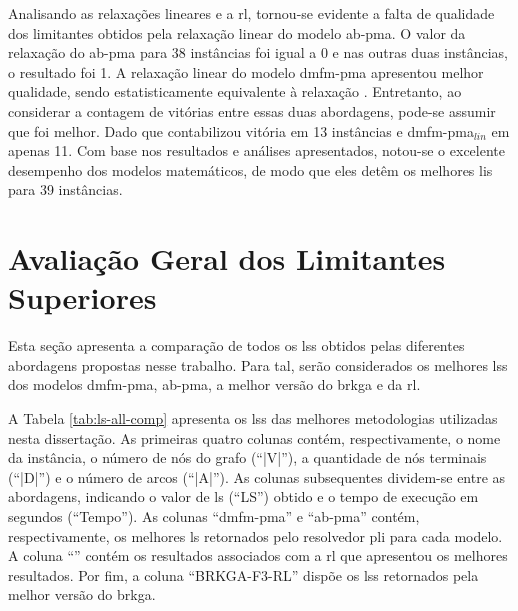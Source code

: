 Analisando as  relaxações lineares e a  \gls{rl}, tornou-se evidente a  falta de
qualidade dos limitantes obtidos pela relaxação linear do modelo \gls{ab-pma}. O
valor da relaxação do \gls{ab-pma} para 38 instâncias foi igual a 0 e nas outras
duas instâncias, o resultado foi 1.  A relaxação linear do modelo \gls{dmfm-pma}
apresentou  melhor qualidade,  sendo  estatisticamente  equivalente à  relaxação
{\rlq}.  Entretanto, ao  considerar  a  contagem de  vitórias  entre essas  duas
abordagens, pode-se assumir que {\rlq}  foi melhor. Dado que {\rlq} contabilizou
vitória em 13  instâncias e {\gls{dmfm-pma}$_{lin}$} em apenas 11.  Com base nos
resultados e análises apresentados, notou-se  o excelente desempenho dos modelos
matemáticos, de modo que eles detêm os melhores \gls{li}s para 39 instâncias.

\section{Avaliação Geral dos Limitantes Superiores} \label{sec:resultados-li}

Esta seção apresenta a comparação de todos os \gls{ls}s obtidos pelas diferentes
abordagens propostas  nesse trabalho. Para  tal, serão considerados  os melhores
\gls{ls}s  dos   modelos  \gls{dmfm-pma},  \gls{ab-pma},  a   melhor  versão  do
\gls{brkga} e da \gls{rl}.

A Tabela \ref{tab:ls-all-comp} apresenta  os \gls{ls}s das melhores metodologias
utilizadas   nesta   dissertação.   As    primeiras   quatro   colunas   contém,
respectivamente, o  nome da  instância, o  número de nós  do grafo  (``|V|''), a
quantidade de nós terminais (``|D|'') e  o número de arcos (``|A|''). As colunas
subsequentes  dividem-se entre  as  abordagens, indicando  o  valor de  \gls{ls}
(``LS'')  obtido e  o  tempo de  execução em  segundos  (``Tempo''). As  colunas
``\gls{dmfm-pma}''  e  ``\gls{ab-pma}''  contém,  respectivamente,  os  melhores
\gls{ls}  retornados  pelo  resolvedor  \gls{pli} para  cada  modelo.  A  coluna
``{\rlq}''  contém os  resultados associados  com a  \gls{rl} que  apresentou os
melhores  resultados. Por  fim,  a coluna  ``BRKGA-F3-RL''  dispõe os  \gls{ls}s
retornados pela melhor versão do \gls{brkga}.


